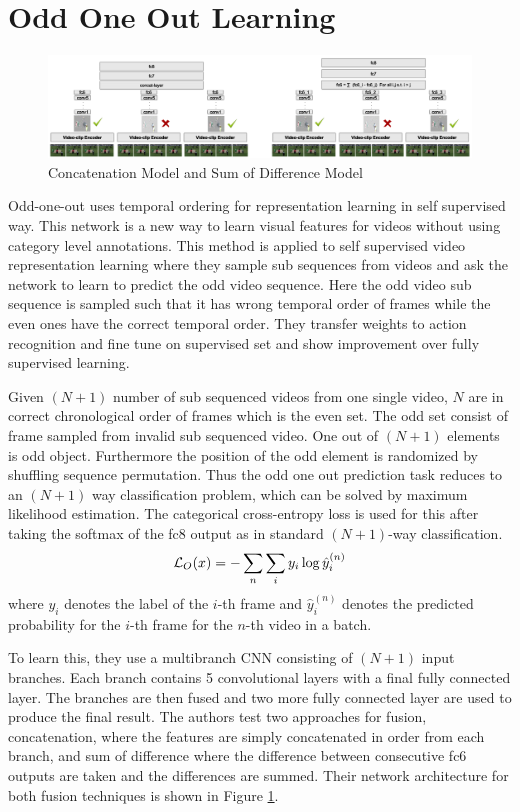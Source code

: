 \section{Odd One Out Learning}\label{sec:o3n}

\begin{figure}
    \centering
    \includegraphics[width=\textwidth]{images/o3n1.png}
    \caption{Concatenation Model and Sum of Difference Model}
    \label{fig:fusionmodel}
\end{figure}

Odd-one-out uses temporal ordering for representation learning in self supervised way.
This network is a new way to learn visual features for videos without using category level annotations. This method is applied to self supervised video representation learning where they sample sub sequences from videos and ask the network to learn to predict the odd video sequence. Here the odd video sub sequence is sampled such that it has wrong temporal order of frames while the even ones have the correct temporal order. 
They transfer weights to action recognition and fine tune on supervised set and show improvement over fully supervised learning.

Given $(N+1)$ number of sub sequenced videos from one single video, $N$ are in correct chronological order of frames which is the even set. The odd set consist of frame sampled from invalid sub sequenced video. One out of $(N+1)$ elements is odd object. Furthermore the position of the odd element is randomized by shuffling sequence permutation. Thus the odd one out prediction task reduces to an $(N+1)$ way classification problem, which can be solved by maximum likelihood estimation. The categorical cross-entropy loss is used for this after taking the softmax of the fc8 output as in standard $(N+1)$-way classification.
\begin{equation}
\mathcal{L}_O(x) = -\sum_n \sum_i y_i \log \hat{y}_i^{(n)}
\end{equation}
where $y_i$ denotes the label of the $i$-th frame and $\hat{y}_i^{(n)}$ denotes the predicted probability for the $i$-th frame for the $n$-th video in a batch.

To learn this, they use a  multibranch CNN consisting of $(N+1)$ input branches. Each branch contains 5 convolutional layers with a final fully connected layer. The branches are then fused and two more fully connected layer are used to produce the final result. The authors test two approaches for fusion,  concatenation, where the features are simply concatenated in order from each branch, and sum of difference where the difference between consecutive fc6 outputs are taken and the differences are summed. Their network architecture for both fusion techniques is shown in Figure \ref{fig:fusionmodel}.

